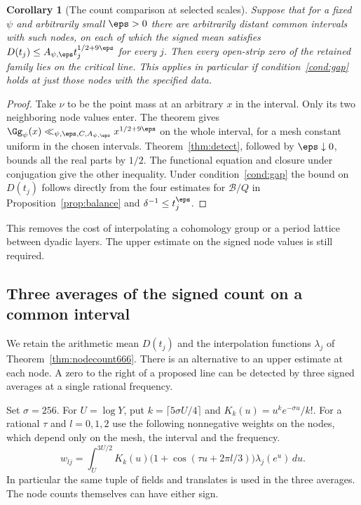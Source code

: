 \documentclass[a4paper,11pt]{article}
\newtheorem{corollary}[proposition]{Corollary}
\theoremstyle{definition}
\theoremstyle{remark}
\numberwithin{equation}{section}
\begin{document}
\begin{corollary}[The count comparison at selected scales]
\leavevmode\label{cor:sparsenodes666}
Suppose that for a fixed \(\psi\) and arbitrarily small
\(\eps>0\) there are arbitrarily distant common intervals with
such nodes, on each of which the signed mean satisfies
\(D(t_j)\le A_{\psi,\eps} t_j^{1/2+9\eps}\) for every \(j\).
Then every open-strip zero of the retained family lies on the
critical line. This applies in particular if
condition~\ref{cond:gap} holds at just those nodes with the
specified data.
\end{corollary}
\begin{proof}
Take \(\nu\) to be the point mass at an arbitrary \(x\) in the
interval. Only its two neighboring node values enter. The theorem
gives \(\Gg_\psi(x)\ll_{\psi,\eps,C,A_{\psi,\eps}}x^{1/2+9\eps}\)
on the whole interval, for a mesh constant uniform in the chosen
intervals. Theorem~\ref{thm:detect}, followed by
\(\eps\downarrow0\), bounds all the real parts by \(1/2\).
The functional equation and closure under conjugation give the
other inequality. Under condition~\ref{cond:gap} the bound on
\(D(t_j)\) follows directly from the four estimates for
\(\mathcal B/Q\) in Proposition~\ref{prop:balance} and
\(\delta^{-1}\le t_j^\eps\).
\end{proof}

This removes the cost of interpolating a cohomology group or a
period lattice between dyadic layers. The upper estimate on the
signed node values is still required.


\subsection{Three averages of the signed count on a common interval}
\label{nav:three-averages-667}

We retain the arithmetic mean \(D(t_j)\) and the interpolation
functions \(\lambda_j\) of Theorem~\ref{thm:nodecount666}. There
is an alternative to an upper estimate at each node. A zero to
the right of a proposed line can be detected by three signed
averages at a single rational frequency.

Set \(\sigma=256\). For \(U=\log Y\), put \(k=\lceil5\sigma U/4\rceil\)
and \(K_k(u)=u^k e^{-\sigma u}/k!\). For a rational \(\tau\) and
\(l=0,1,2\) use the following nonnegative weights on the nodes,
which depend only on the mesh, the interval and the frequency.
\[
 w_{lj}=\int_U^{3U/2} K_k(u)
   \bigl(1+\cos(\tau u+2\pi l/3)\bigr)\lambda_j(e^u)\,du .
\]
In particular the same tuple of fields and translates is used in
the three averages. The node counts themselves can have either sign.
\end{document}
